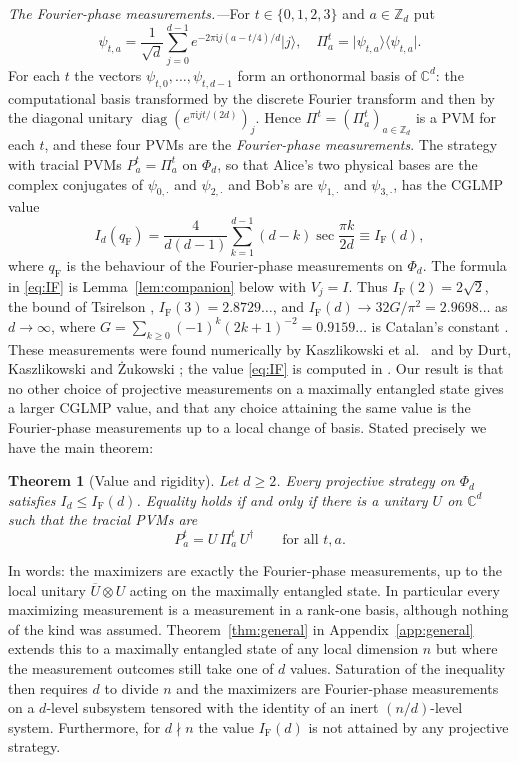 \documentclass[aps,prl,reprint,superscriptaddress,longbibliography,floatfix,raggedbottom]{revtex4-2}
\newtheorem{theorem}{Theorem}
\newcommand{\C}{\mathbb C}
\newcommand{\Z}{\mathbb Z}
\newcommand{\ii}{\mathrm i}
\newcommand{\ket}[1]{\lvert #1\rangle}
\newcommand{\bra}[1]{\langle #1\rvert}
\DeclareMathOperator{\diag}{diag}
\newcommand{\IF}{I_{\mathrm F}}
\newcommand{\Gcat}{G}
\begin{document}
\emph{The Fourier-phase measurements.---}For $t\in\{0,1,2,3\}$ and
$a\in\Z_d$ put
\begin{equation}\label{eq:standard}
\psi_{t,a}=\frac1{\sqrt d}\sum_{j=0}^{d-1}
e^{-2\pi\ii j(a-t/4)/d}\ket j,\quad
\Pi^t_a=\ket{\psi_{t,a}}\bra{\psi_{t,a}}.
\end{equation}
For each $t$ the vectors $\psi_{t,0},\dots,\psi_{t,d-1}$ form an
orthonormal basis of $\C^d$: the computational basis transformed by the
discrete Fourier transform and then by the diagonal unitary
$\diag(e^{\pi\ii jt/(2d)})_j$. Hence $\Pi^t=(\Pi^t_a)_{a\in\Z_d}$ is a
PVM for each $t$, and these four PVMs are the \emph{Fourier-phase
measurements}. The strategy with tracial PVMs
$P^t_a=\Pi^t_a$ on $\Phi_d$, so that Alice's two physical bases are the
complex conjugates of $\psi_{0,\cdot}$ and $\psi_{2,\cdot}$ and Bob's are
$\psi_{1,\cdot}$ and $\psi_{3,\cdot}$, has the CGLMP value
\begin{equation}\label{eq:IF}
I_d(q_{\mathrm F})  = \frac4{d(d-1)}\sum_{k=1}^{d-1}(d-k)\sec\frac{\pi k}{2d} \equiv \IF(d),
\end{equation}
where $q_{\mathrm F}$ is the behaviour of the Fourier-phase measurements on
$\Phi_d$.
The formula in \eqref{eq:IF} is Lemma~\ref{lem:companion} below with $V_j=I$. Thus
$\IF(2)=2\sqrt2$, the bound of Tsirelson \cite{Tsirelson},
$\IF(3)=2.8729\ldots$, and $\IF(d)\to32\Gcat/\pi^2=2.9698\ldots$ as
$d\to\infty$, where $\Gcat=\sum_{k\ge0}(-1)^k(2k+1)^{-2}=0.9159\ldots$ is
Catalan's constant \cite{DLMF,ZG}. These measurements were found
numerically by Kaszlikowski et al.\ \cite{KGZMZ} and by Durt,
Kaszlikowski and \.Zukowski \cite{DKZ}; the value \eqref{eq:IF} is
computed in \cite{CGLMP}. Our result is that no other choice of projective
measurements on a maximally entangled state gives a larger CGLMP
value, and that any choice attaining the same value is the
Fourier-phase measurements up to a local change of basis. Stated precisely we have the main theorem:

\begin{theorem}[Value and rigidity]\label{thm:main}
Let $d\ge2$. Every projective strategy on $\Phi_d$ satisfies
$I_d\le\IF(d)$. Equality holds if and only if there is a unitary $U$
on $\C^d$ such that the tracial PVMs are
\[
P^t_a=U\,\Pi^t_a\,U^\dagger\qquad\text{for all }t,a.
\]
\end{theorem}

In words: the maximizers are exactly the Fourier-phase measurements,
up to the local unitary $\overline U\otimes U$ acting on the maximally entangled state. In particular every
maximizing measurement is a measurement in a rank-one basis, although
nothing of the kind was assumed. Theorem~\ref{thm:general} in
Appendix~\ref{app:general} extends this to a maximally entangled state
of any local dimension $n$ but where the measurement outcomes still take one of $d$ values. Saturation of the inequality then requires $d$ to divide $n$ and
the maximizers are Fourier-phase measurements on a $d$-level subsystem
tensored with the identity of an inert $(n/d)$-level system. Furthermore, for
$d\nmid n$ the value $\IF(d)$ is not attained by any projective
strategy.
\end{document}
